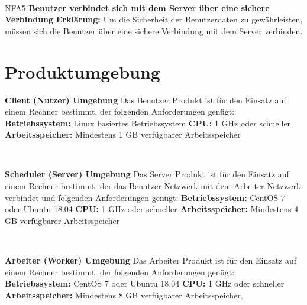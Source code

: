 \documentclass[a4paper,12pt]{article}
\begin{document}
\begin{itemize}[nosep]
\begin{minipage}[t]{\linewidth}
	\end{minipage}
	\newline
	\\
	
	\begin{minipage}[t]{\linewidth}
		\item[NFA5]\hspace{\parindent}  \textbf{Benutzer verbindet sich mit dem Server über eine sichere Verbindung}
		\subitem \textbf{Erklärung:} Um die Sicherheit der Benutzerdaten zu gewährleisten, müssen sich die Benutzer über eine sichere Verbindung mit dem Server verbinden.
	
	\end{minipage}
\end{itemize}
\newpage

\section{Produktumgebung}

\begin{itemize}
\begin{minipage}[t]{\linewidth}
\item \textbf{Client (Nutzer) Umgebung}\newline
Das Benutzer Produkt ist für den Einsatz auf einem Rechner bestimmt, der folgenden Anforderungen genügt:
\subitem \textbf{Betriebssystem:} Linux basiertes Betriebssystem
\subitem \textbf{CPU:} 1 GHz oder schneller
\subitem \textbf{Arbeitsspeicher:} Mindestens 1 GB verfügbarer Arbeitsspeicher
\end{minipage}
\\

\begin{minipage}[t]{\linewidth}
\item \textbf{Scheduler (Server) Umgebung}\newline
Das Server Produkt ist für den Einsatz auf einem Rechner bestimmt, der das Benutzer Netzwerk mit dem Arbeiter Netzwerk verbindet und folgenden Anforderungen genügt:
\subitem \textbf{Betriebssystem:} CentOS 7 oder Ubuntu 18.04
\subitem \textbf{CPU:} 1 GHz oder schneller
\subitem \textbf{Arbeitsspeicher:} Mindestens 4 GB verfügbarer Arbeitsspeicher
\end{minipage}
\\

\begin{minipage}[t]{\linewidth}
\item \textbf{Arbeiter (Worker) Umgebung}\newline
Das Arbeiter Produkt ist für den Einsatz auf einem Rechner bestimmt, der folgenden Anforderungen genügt:
\subitem \textbf{Betriebssystem:} CentOS 7 oder Ubuntu 18.04
\subitem \textbf{CPU:} 1 GHz oder schneller
\subitem \textbf{Arbeitsspeicher:} Mindestens 8 GB verfügbarer Arbeitsspeicher, 
\end{minipage}
\end{itemize}
\end{document}
